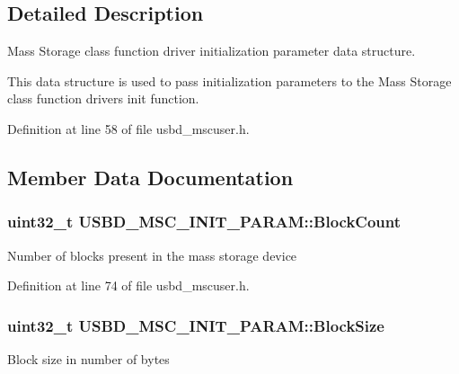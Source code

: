 \subsection{Detailed Description}
Mass Storage class function driver initialization parameter data structure. 

This data structure is used to pass initialization parameters to the Mass Storage class function driver\textquotesingle{}s init function. 

Definition at line 58 of file usbd\+\_\+mscuser.\+h.



\subsection{Member Data Documentation}
\subsubsection[{\texorpdfstring{Block\+Count}{BlockCount}}]{\setlength{\rightskip}{0pt plus 5cm}uint32\+\_\+t U\+S\+B\+D\+\_\+\+M\+S\+C\+\_\+\+I\+N\+I\+T\+\_\+\+P\+A\+R\+A\+M\+::\+Block\+Count}\hypertarget{structUSBD__MSC__INIT__PARAM_a88951ad7bc026318e18eadf372804caa}{}\label{structUSBD__MSC__INIT__PARAM_a88951ad7bc026318e18eadf372804caa}
Number of blocks present in the mass storage device 

Definition at line 74 of file usbd\+\_\+mscuser.\+h.

\subsubsection[{\texorpdfstring{Block\+Size}{BlockSize}}]{\setlength{\rightskip}{0pt plus 5cm}uint32\+\_\+t U\+S\+B\+D\+\_\+\+M\+S\+C\+\_\+\+I\+N\+I\+T\+\_\+\+P\+A\+R\+A\+M\+::\+Block\+Size}\hypertarget{structUSBD__MSC__INIT__PARAM_af0ed8a5b4aec5f19e1b15c1ab3c3dcbd}{}\label{structUSBD__MSC__INIT__PARAM_af0ed8a5b4aec5f19e1b15c1ab3c3dcbd}
Block size in number of bytes 

